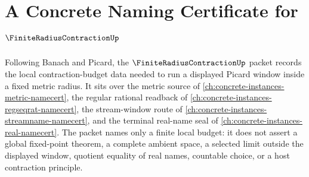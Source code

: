 \chapter{A Concrete Naming Certificate for $\FiniteRadiusContractionUp$}
\label{ch:concrete-instances-finite-radius-contraction-namecert}

Following Banach and Picard, the $\FiniteRadiusContractionUp$ packet records the local contraction-budget data needed to run a displayed Picard window inside a fixed metric radius. It sits over the metric source of \autoref{ch:concrete-instances-metric-namecert}, the regular rational readback of \autoref{ch:concrete-instances-regseqrat-namecert}, the stream-window route of \autoref{ch:concrete-instances-streamname-namecert}, and the terminal real-name seal of \autoref{ch:concrete-instances-real-namecert}. The packet names only a finite local budget: it does not assert a global fixed-point theorem, a complete ambient space, a selected limit outside the displayed window, quotient equality of real names, countable choice, or a host contraction principle.

